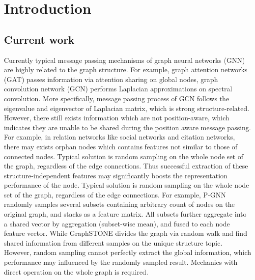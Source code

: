 \documentclass[english,onecolumn]{IEEEtran}
\begin{document}
	
	
	
	
	\section{Introduction}
	\subsection{Current work}
	Currently typical message passing mechanisms of graph neural networks (GNN) are highly related to the graph structure. For example, graph attention networks (GAT)\cite{gat} passes information via attention sharing on global nodes, graph convolution network (GCN)\cite{gcn} performs Laplacian approximations on spectral convolution. More specifically, message passing process of GCN follows the eigenvalue and eigenvector of Laplacian matrix, which is strong structure-related. However, there still exists information which are not position-aware, which indicates they are unable to be shared during the position aware message passing. For example, in relation networks like social networks and citation networks, there may exists orphan nodes which contains features not similar to those of connected nodes. Typical solution is random sampling on the whole node set of the graph, regardless of the edge connections. Thus successful extraction of these structure-independent features may significantly boosts the representation performance of the node. Typical solution is random sampling on the whole node set of the graph, regardless of the edge connections. For example, P-GNN\cite{b1} randomly samples several subsets containing arbitrary count of nodes on the original graph, and stacks as a  feature matrix. All subsets further aggregate into a shared vector by aggregation (subset-wise mean), and fused to each node feature vector. While GraphSTONE\cite{b2} divides the graph via random walk and find shared information from different samples on the unique structure topic. However, random sampling cannot perfectly extract the global information, which performance may influenced by the randomly sampled result. Mechanics with direct operation on the whole graph is required. 
	
\end{document}
